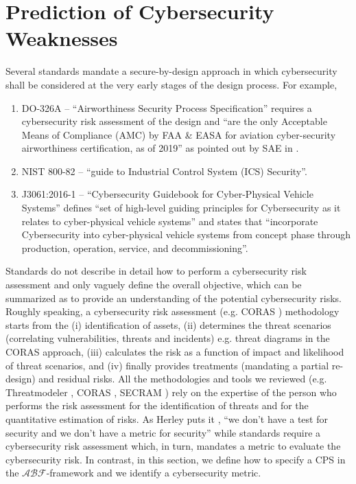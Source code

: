 \documentclass[conference]{IEEEtran}
\newcommand{\assertionRegion}{\mathcal{A}}
\newcommand{\beliefRegion}{\mathcal{B}}
\newcommand{\factRegion}{\mathcal{F}}
\newcommand{\abftheory}{\assertionRegion\beliefRegion\factRegion}
\begin{document}
\section{Prediction of Cybersecurity Weaknesses}\label{sec:theory}
Several standards mandate a secure-by-design approach in which cybersecurity
shall be considered at the very early stages of the design process.  For
example,
\begin{enumerate}[noitemsep]
	\item DO-326A -- ``Airworthiness Security Process Specification''
		requires a cybersecurity risk assessment of the design and
		``are the only Acceptable Means of Compliance (AMC) by FAA
		\& EASA for aviation cyber-security airworthiness certification,
		as of 2019'' as pointed out by SAE in \autocite{SAE2019DO326A}.
	\item NIST 800-82 \autocite{Stouffer2011guide} -- ``guide to Industrial
		Control System (ICS) Security''.
	\item J3061:2016-1 \autocite{SAE2016J3061} -- ``Cybersecurity Guidebook
		for Cyber-Physical Vehicle Systems'' defines ``set of
		high-level guiding principles for Cybersecurity as it relates
		to cyber-physical vehicle systems'' and states that
		``incorporate Cybersecurity into cyber-physical vehicle systems
		from concept phase through production, operation, service, and
		decommissioning''.
\end{enumerate}
Standards do not describe in detail how to perform a cybersecurity risk 
assessment and only vaguely define the overall objective, which
can be summarized as to provide an understanding of the potential cybersecurity risks.
Roughly speaking, a cybersecurity risk assessment (e.g. CORAS \autocite{Lund2010model}) 
methodology starts from the (i) identification of assets, (ii) determines
the threat scenarios (correlating vulnerabilities, threats and incidents) e.g. 
threat diagrams in the CORAS
approach, (iii) calculates the risk as a function
of impact and likelihood of threat scenarios, and (iv) finally provides
treatments (mandating a partial re-design) and residual risks.
All the methodologies and tools we reviewed (e.g. Threatmodeler \autocite{Threatmodeler},
CORAS \autocite{Lund2010model}, SECRAM \autocite{De2015role})
rely on the expertise of the person who performs the risk assessment for
the identification of threats and for the quantitative estimation of risks.
As Herley puts it \autocite{Herley2016usenixvideo}, ``we don't have a test for security and
we don't have a metric for security'' while standards require a cybersecurity risk assessment
which, in turn, mandates a metric to evaluate the cybersecurity risk. 
In contrast, in this section, we define how to specify a CPS in the $\abftheory$-framework
and we identify a cybersecurity metric.
\end{document}
